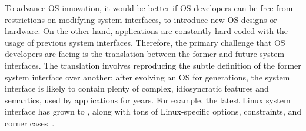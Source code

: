 To advance OS innovation,
it would be better if OS developers can be free from restrictions
on modifying system interfaces,
to introduce new OS designs or hardware.
On the other hand, applications are constantly hard-coded with
the usage of previous system interfaces.
Therefore, the primary challenge that
OS developers are facing
is the translation between the former and future system interfaces.
The translation involves
reproducing the subtle definition of the former system interface
over another;
after evolving an OS for generations,
the system interface is likely to contain
plenty of complex, idiosyncratic
features and semantics, used by applications for years.
For example, the latest Linux system interface has grown to  \linuxapis{},
along with tons of Linux-specific
options, constraints, and corner cases~\cite{linux-man-syscall}.







%



